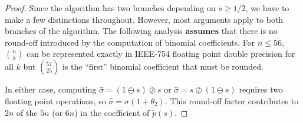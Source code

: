 \documentclass[letterpaper,10pt]{article}
\theoremstyle{definition}
\begin{document}
\begin{proof}
Since the algorithm has two branches depending on \(s \geq 1/2\), we
have to make a few distinctions throughout. However, most arguments
apply to both branches of the algorithm. The following analysis
\textbf{assumes}
that there is no round-off introduced by the computation of binomial
coefficients. For \(n \leq 56\), \(\binom{n}{k}\) can be represented exactly
in IEEE-754 floating point double precision for all \(k\) but
\(\binom{57}{25}\) is the
``first'' binomial coefficient that must be rounded.

In either case, computing
\(\widehat{\sigma} = (1 \ominus s) \oslash s\) or
\(\widehat{\sigma} = s \oslash (1 \ominus s)\) requires two floating
point operations, so
\(\widehat{\sigma} = \sigma\left(1 + \theta_2\right)\). This round-off
factor contributes to \(2n\) of the \(5n\) (or \(6n\)) in the coefficient
of \(\widetilde{p}(s)\).


\end{proof}
\end{document}
